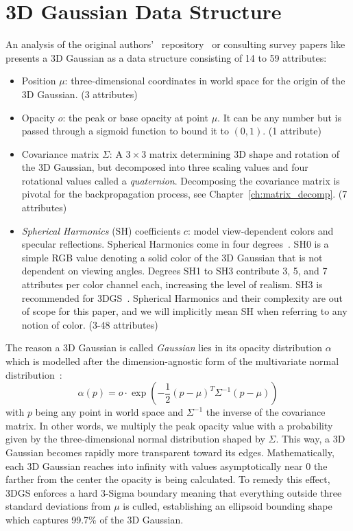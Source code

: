 \section{3D Gaussian Data Structure}
\label{ch:gaussian}
An analysis of the original authors'~\cite{kerbl3DGaussianSplatting2023} repository~\cite{kerblRepo} or consulting survey papers like~\cite{bagdasarian3DGSzipSurvey3D2025} presents a 3D Gaussian as a data structure consisting of 14 to 59 attributes:

\begin{itemize}
    \item Position $\mu$: three-dimensional coordinates in world space for the origin of the 3D Gaussian. (3 attributes)
    \item Opacity $o$: the peak or base opacity at point $\mu$. It can be any number but is passed through a sigmoid function to bound it to $(0,1)$. (1 attribute)
    \item Covariance matrix $\Sigma$: A $3\times 3$ matrix determining 3D shape and rotation of the 3D Gaussian, but decomposed into three scaling values and four rotational values called a \textit{quaternion}. Decomposing the covariance matrix is pivotal for the backpropagation process, see Chapter~\ref{ch:matrix_decomp}. (7 attributes)
    \item \textit{Spherical Harmonics} (SH) coefficients $c$: model view-dependent colors and specular reflections. Spherical Harmonics come in four degrees~\cite{plenoctrees}. SH0 is a simple RGB value denoting a solid color of the 3D Gaussian that is not dependent on viewing angles. Degrees SH1 to SH3 contribute 3, 5, and 7 attributes per color channel each,  increasing the level of realism. SH3 is recommended for 3DGS~\cite{kerbl3DGaussianSplatting2023}. Spherical Harmonics and their complexity are out of scope for this paper, and we will implicitly mean SH when referring to any notion of color. (3-48 attributes)
\end{itemize}
The reason a 3D Gaussian is called \textit{Gaussian} lies in its opacity distribution $\alpha$ which is modelled after the dimension-agnostic form of the multivariate normal distribution~\cite{zwickerSurfaceSplatting2001}: $$ \alpha(p) = o \cdot \exp\left(-\frac{1}{2}(p - \mu)^T \Sigma^{-1}(p - \mu)\right) $$ with $p$ being any point in world space and $\Sigma^{-1}$ the inverse of the covariance matrix.
In other words, we multiply the peak opacity value with a probability given by the three-dimensional normal distribution shaped by $\Sigma$. This way, a 3D Gaussian becomes rapidly more transparent toward its edges. Mathematically, each 3D Gaussian reaches into infinity with values asymptotically near 0 the farther from the center the opacity is being calculated. 
To remedy this effect, 3DGS enforces a hard 3-Sigma boundary meaning that everything outside three standard deviations from $\mu$ is culled, establishing an ellipsoid bounding shape which captures 99.7\% of the 3D Gaussian.

